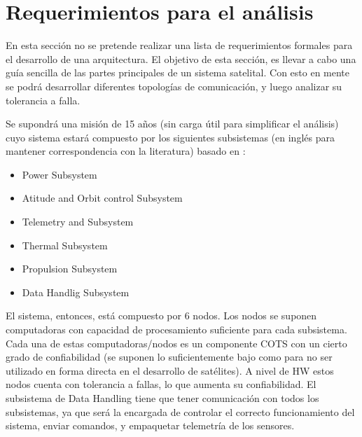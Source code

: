\section{Requerimientos para el análisis}\label{sec:req_analisis}
En esta sección no se pretende realizar una lista de requerimientos formales para el desarrollo de una arquitectura. El objetivo de esta sección, es llevar a cabo una guía sencilla de las partes principales de un sistema satelital. Con esto en mente se podrá desarrollar diferentes topologías de comunicación, y luego analizar su tolerancia a falla.

Se supondrá una misión de 15 años (sin carga útil para simplificar el análisis) cuyo sistema estará compuesto por los siguientes subsistemas (en inglés para mantener correspondencia con la literatura) basado en \cite{Fontescue03}:
\begin{itemize}
\item Power Subsystem
\item Atitude and Orbit control Subsystem
\item Telemetry and Subsystem
\item Thermal Subsystem
\item Propulsion Subsystem
\item Data Handlig Subsystem
\end{itemize}

El sistema, entonces, está compuesto por 6 nodos. Los nodos se suponen computadoras con capacidad de procesamiento suficiente para cada subsistema. Cada una de estas computadoras/nodos es un componente COTS con un cierto grado de confiabilidad (se suponen lo suficientemente bajo como para no ser utilizado en forma directa en el desarrollo de satélites). A nivel de \ac{HW} estos nodos cuenta con tolerancia a fallas, lo que aumenta su confiabilidad. El subsistema de Data Handling tiene que tener comunicación con todos los subsistemas, ya que será la encargada de controlar el correcto funcionamiento del sistema, enviar comandos, y empaquetar telemetría de los sensores.



